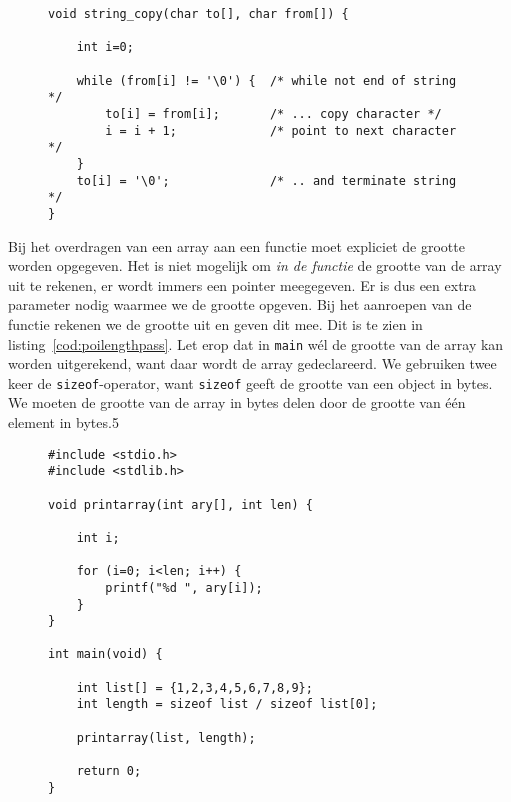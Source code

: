 \begin{figure}[!ht]
\begin{lstlisting}[caption=Functie voor het kopieren van een string.,label=cod:poicopystrings2]
void string_copy(char to[], char from[]) {

    int i=0;

    while (from[i] != '\0') {  /* while not end of string */
        to[i] = from[i];       /* ... copy character */
        i = i + 1;             /* point to next character */
    }
    to[i] = '\0';              /* .. and terminate string */
}
\end{lstlisting}
\end{figure}

Bij het overdragen van een array aan een functie moet expliciet de grootte worden opgegeven. Het is niet mogelijk om \textsl{in de functie} de grootte van de array uit te rekenen, er wordt immers een pointer meegegeven. Er is dus een extra parameter nodig waarmee we de grootte opgeven. Bij het aanroepen van de functie rekenen we de grootte uit en geven dit mee. Dit is te zien in listing~\ref{cod:poilengthpass}. Let erop dat in \texttt{main} w\'el de grootte van de array kan worden uitgerekend, want daar wordt de array gedeclareerd. We gebruiken twee keer de \texttt{sizeof}-operator, want \texttt{sizeof} geeft de grootte van een object in bytes. We moeten de grootte van de array in bytes delen door de grootte van \'e\'en element in bytes.5

\begin{figure}[!ht]
\begin{lstlisting}[caption=Meegeven van de grootte van een array.,label=cod:poilengthpass]
#include <stdio.h>
#include <stdlib.h>

void printarray(int ary[], int len) {

    int i;

    for (i=0; i<len; i++) {
        printf("%d ", ary[i]);
    }
}

int main(void) {

    int list[] = {1,2,3,4,5,6,7,8,9};
    int length = sizeof list / sizeof list[0];

    printarray(list, length);

    return 0;
}
\end{lstlisting}
\end{figure}

